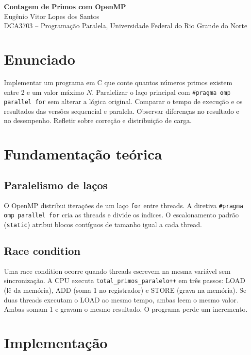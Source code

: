 \documentclass[11pt,letterpaper]{article}
\begin{document}
\pagestyle{plain}

\begin{center}
    {\LARGE\bfseries Contagem de Primos com OpenMP}\\[0.4em]
    {\normalsize Eugênio Vitor Lopes dos Santos}\\[0.3em]
    {\small DCA3703 -- Programação Paralela, Universidade Federal do Rio Grande do Norte}\\[0.3em]
\end{center}


\section{Enunciado}
Implementar um programa em C que conte quantos números primos existem entre 2 e um valor máximo $N$. Paralelizar o laço principal com \texttt{\#pragma omp parallel for} sem alterar a lógica original. Comparar o tempo de execução e os resultados das versões sequencial e paralela. Observar diferenças no resultado e no desempenho. Refletir sobre correção e distribuição de carga.

\section{Fundamentação teórica}

\subsection{Paralelismo de laços}
O OpenMP distribui iterações de um laço \texttt{for} entre threads. A diretiva \texttt{\#pragma omp parallel for} cria as threads e divide os índices. O escalonamento padrão (\texttt{static}) atribui blocos contíguos de tamanho igual a cada thread.

\subsection{Race condition}
Uma race condition ocorre quando threads escrevem na mesma variável sem sincronização. A CPU executa \texttt{total\_primos\_paralelo++} em três passos: LOAD (lê da memória), ADD (soma 1 no registrador) e STORE (grava na memória). Se duas threads executam o LOAD ao mesmo tempo, ambas leem o mesmo valor. Ambas somam 1 e gravam o mesmo resultado. O programa perde um incremento.

\section{Implementação}
\end{document}
